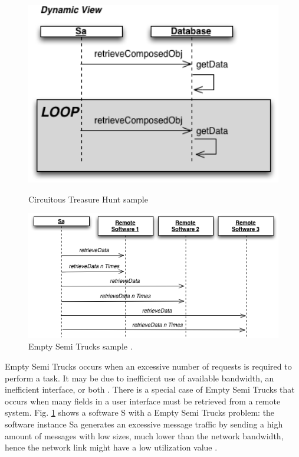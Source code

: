 \documentclass[espaco=umemeio,chapter=TITLE,twoside,openright]{abnt}
\begin{document}
\begin{figure}[h]
\begin{minipage}{.5\textwidth}
\centering
\includegraphics[width=1\textwidth]{./images/circuit.png}
\caption{Circuitous
Treasure Hunt sample \cite{Vetoio2011}}
\label{fig:circuit}
\end{minipage}
\begin{minipage}{.5\textwidth}
\centering
\includegraphics[width=1.2\textwidth]{./images/trucks2.png}
\caption{Empty Semi Trucks sample \cite{Vetoio2011}.}
\label{fig:trucks}
\end{minipage}
\end{figure}

Empty Semi Trucks occurs when an excessive number of requests is required to perform a task. It may be due to inefficient use of available bandwidth, an inefficient interface, or both \cite{Arcelli2012}. There is a special case of Empty Semi Trucks that occurs  when many fields in a user interface must be retrieved from a
remote system. Fig. \ref{fig:trucks} shows a software S with a Empty Semi Trucks problem: the software instance Sa generates an excessive message traffic by sending a high amount of messages with low sizes, much lower than the network bandwidth, hence the network link might have a low utilization value \cite{Vetoio2011}.
\end{document}
